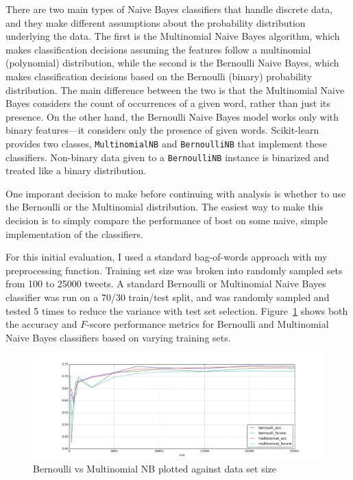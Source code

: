 \documentclass[letter,12pt]{article}
\begin{document}
There are two main types of Naive Bayes classifiers that handle discrete data,
and they make different assumptions about the probability distribution
underlying the data. The first is the Multinomial Naive Bayes algorithm, which
makes classification decisions assuming the features follow a multinomial
(polynomial) distribution, while the second is the Bernoulli Naive Bayes, which
makes classification decisions based on the Bernoulli (binary) probability
distribution. The main difference between the two is that the Multinomial Naive
Bayes considers the count of occurrences of a given word, rather than just its
presence. On the other hand, the Bernoulli Naive Bayes model works only with
binary features---it considers only the presence of given words. Scikit-learn
provides two classes, \texttt{MultinomialNB} and \texttt{BernoulliNB} that
implement these classifiers. Non-binary data given to a \texttt{BernoulliNB}
instance is binarized and treated like a binary distribution.

One imporant decision to make before continuing with analysis is whether to use
the Bernoulli or the Multinomial distribution. The easiest way to make this
decision is to simply compare the performance of bost on some naive, simple
implementation of the classifiers.

For this initial evaluation, I used a standard bag-of-words approach with my
preprocessing function. Training set size was broken into randomly sampled sets
from 100 to 25000 tweets. A standard Bernoulli or Multinomial Naive Bayes
classifier was run on a 70/30 train/test split, and was randomly sampled and
tested 5 times to reduce the variance with test set selection.
Figure~\ref{fig:bow_bernoulli_vs_multinomial} shows both the accuracy and
$F$-score performance metrics for Bernoulli and Multinomial Naive Bayes
classifiers based on varying training sets.

\begin{figure}[h]
  \centering
  \includegraphics[width=\linewidth]{img/bow_bernoulli_vs_multinomial.png}
  \caption{Bernoulli vs Multinomial NB plotted against data set size}
  \label{fig:bow_bernoulli_vs_multinomial}
\end{figure}
\end{document}
